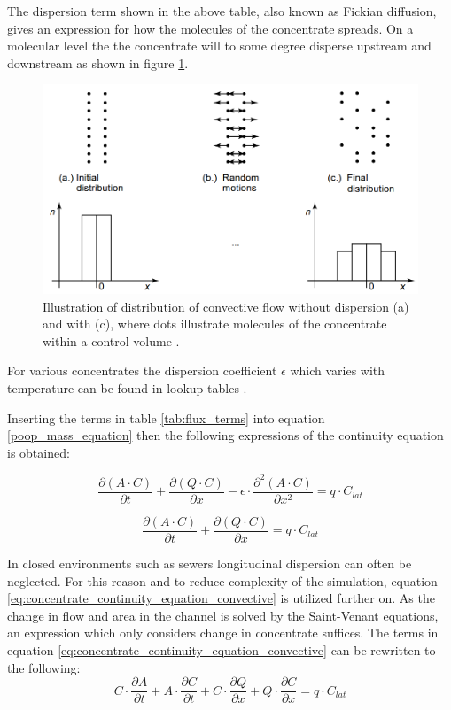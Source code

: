 The dispersion term shown in the above table, also known as Fickian diffusion, gives an expression for how the molecules of the concentrate spreads. On a molecular level the the concentrate will to some degree disperse upstream and downstream as shown in figure \ref{fig:diffusion_example}. 

\begin{figure}[H]
\centering
\includegraphics[width=.75\textwidth]{report/modeling/pictures/diffusion_example.png}
\caption{Illustration of distribution of convective flow without dispersion (a) and with (c), where dots illustrate molecules of the concentrate within a control volume \cite{karlruhe_con_def_dif_equation}.}
\label{fig:diffusion_example}
\end{figure} 

For various concentrates the dispersion coefficient $\epsilon$ which varies with temperature can be found in lookup tables \cite{karlruhe_con_def_dif_equation}.

Inserting the terms in table \ref{tab:flux_terms} into equation \ref{poop_mass_equation} then the following expressions of the continuity equation is obtained:

\begin{equation}
	\frac{\partial (A\cdot C)}{\partial t} + \frac{\partial (Q \cdot C)}{\partial x} - \epsilon \cdot \frac{\partial^2 (A \cdot C)}{\partial x^2} = q \cdot C_{lat} 
\label{eq:concentrate_continuity_equation_dispersion}
\end{equation}

\begin{equation}
\frac{\partial (A\cdot C)}{\partial t} + \frac{\partial (Q \cdot C)}{\partial x} = q \cdot C_{lat} 
\label{eq:concentrate_continuity_equation_convective}
\end{equation}

In closed environments such as sewers longitudinal dispersion can often be neglected\cite{vestergaard1989numerical}. For this reason and to reduce complexity of the simulation, equation \ref{eq:concentrate_continuity_equation_convective} is utilized further on.
As the change in flow and area in the channel is solved by the Saint-Venant equations, an expression which only considers change in concentrate suffices.
The terms in equation \ref{eq:concentrate_continuity_equation_convective} can be rewritten to the following:
\begin{equation}
	C \cdot \frac{\partial A}{\partial t} + A \cdot \frac{\partial C}{\partial t} + C \cdot \frac{\partial Q}{\partial x} + Q \cdot \frac{\partial C}{\partial x} = q \cdot C_{lat}
\label{eq:poop_trans_deriv1}
\end{equation}

